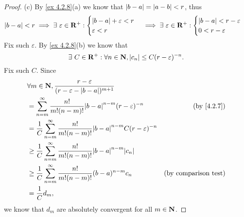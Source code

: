 \begin{proof}{(c)}
  By \cref{ex 4.2.8}(a) we know that \(\left\lvert b - a\right\rvert = \left\lvert a - b\right\rvert < r\), thus
  \[
    \left\lvert b - a\right\rvert < r \implies \exists\ \varepsilon \in \mathbf{R}^+ : \begin{cases}
      \left\lvert b - a\right\rvert + \varepsilon < r \\
      \varepsilon < r
    \end{cases} \implies \exists\ \varepsilon \in \mathbf{R}^+ : \begin{cases}
      \left\lvert b - a\right\rvert < r - \varepsilon \\
      0 < r - \varepsilon
    \end{cases}
  \]
  Fix such \(\varepsilon\).
  By \cref{ex 4.2.8}(b) we know that
  \[
    \exists\ C \in \mathbf{R}^+ : \forall n \in \mathbf{N}, \left\lvert c_n\right\rvert \leq C (r - \varepsilon)^{-n}.
  \]
  Fix such \(C\).
  Since
  \begin{align*}
     & \forall m \in \N, \frac{r - \varepsilon}{(r - \varepsilon - \abs{b - a})^{m + 1}}                                                   \\
     & = \sum_{n = m}^\infty \frac{n!}{m! (n - m)!} \abs{b - a}^{n - m} (r - \varepsilon)^{-n}               & \text{(by \cref{4.2.7})}    \\
     & = \frac{1}{C} \sum_{n = m}^\infty \frac{n!}{m! (n - m)!} \abs{b - a}^{n - m} C (r - \varepsilon)^{-n}                               \\
     & \geq \frac{1}{C} \sum_{n = m}^\infty \frac{n!}{m! (n - m)!} \abs{b - a}^{n - m} \abs{c_n}                                           \\
     & \geq \frac{1}{C} \sum_{n = m}^\infty \frac{n!}{m! (n - m)!} (b - a)^{n - m} c_n                       & \text{(by comparison test)} \\
     & = \frac{1}{C} d_m,
  \end{align*}
  we know that \(d_m\) are absolutely convergent for all \(m \in \mathbf{N}\).
\end{proof}

